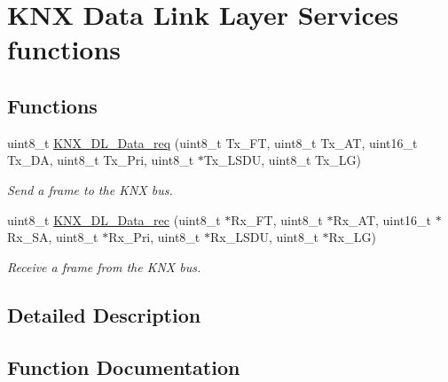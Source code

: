 \hypertarget{group___k_n_x___d_l___exported___functions___group2}{}\section{K\+NX Data Link Layer Services functions}
\label{group___k_n_x___d_l___exported___functions___group2}
\subsection*{Functions}
\begin{DoxyCompactItemize}
\item 
uint8\+\_\+t \hyperlink{group___k_n_x___d_l___exported___functions___group2_ga92e01d8fd06b0e629413b1b2316d88df}{K\+N\+X\+\_\+\+D\+L\+\_\+\+Data\+\_\+req} (uint8\+\_\+t Tx\+\_\+\+FT, uint8\+\_\+t Tx\+\_\+\+AT, uint16\+\_\+t Tx\+\_\+\+DA, uint8\+\_\+t Tx\+\_\+\+Pri, uint8\+\_\+t $\ast$Tx\+\_\+\+L\+S\+DU, uint8\+\_\+t Tx\+\_\+\+LG)
\begin{DoxyCompactList}\small\item\em Send a frame to the K\+NX bus. \end{DoxyCompactList}\item 
uint8\+\_\+t \hyperlink{group___k_n_x___d_l___exported___functions___group2_ga0c46f3170607b4b8c5026154d678c18e}{K\+N\+X\+\_\+\+D\+L\+\_\+\+Data\+\_\+rec} (uint8\+\_\+t $\ast$Rx\+\_\+\+FT, uint8\+\_\+t $\ast$Rx\+\_\+\+AT, uint16\+\_\+t $\ast$Rx\+\_\+\+SA, uint8\+\_\+t $\ast$Rx\+\_\+\+Pri, uint8\+\_\+t $\ast$Rx\+\_\+\+L\+S\+DU, uint8\+\_\+t $\ast$Rx\+\_\+\+LG)
\begin{DoxyCompactList}\small\item\em Receive a frame from the K\+NX bus. \end{DoxyCompactList}\end{DoxyCompactItemize}


\subsection{Detailed Description}


\subsection{Function Documentation}
